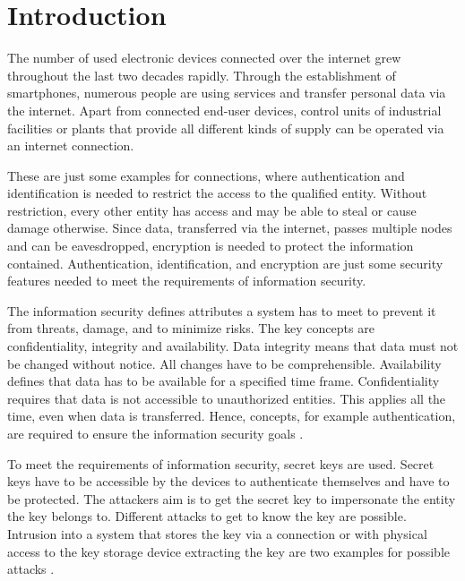 \chapter{Introduction}
\label{cap:introduction}

The number of used electronic devices connected over the internet grew throughout the last two decades rapidly.
Through the establishment of smartphones, numerous people are using services and transfer personal data via the internet. %
Apart from connected end-user devices, control units of industrial facilities or plants that provide all different kinds of supply can be operated via an internet connection. %

These are just some examples for connections, where authentication and identification is needed to restrict the access to the qualified entity.
Without restriction, every other entity has access and may be able to steal or cause damage otherwise. %
Since data, transferred via the internet, passes multiple nodes and can be eavesdropped, encryption is needed to protect the information contained.
Authentication, identification, and encryption are just some security features needed to meet the requirements of information security.

The information security defines attributes a system has to meet to prevent it from threats, damage, and to minimize risks.
The key concepts are confidentiality, integrity and availability. %
Data integrity means that data must not be changed without notice.
All changes have to be comprehensible.
Availability defines that data has to be available for a specified time frame. %
Confidentiality requires that data is not accessible to unauthorized entities.
This applies all the time, even when data is transferred.
Hence, concepts, for example authentication, are required to ensure the information security goals \cite{ISO27000}.

To meet the requirements of information security, secret keys are used.
Secret keys have to be accessible by the devices to authenticate themselves and have to be protected. %
The attackers aim is to get the secret key to impersonate the entity the key belongs to.
Different attacks to get to know the key are possible.
Intrusion into a system that stores the key via a connection or with physical access to the key storage device extracting the key are two examples for possible attacks \cite{IETF2000InternetGlossary,Skorobogatov2012PhysicalResistance}.


